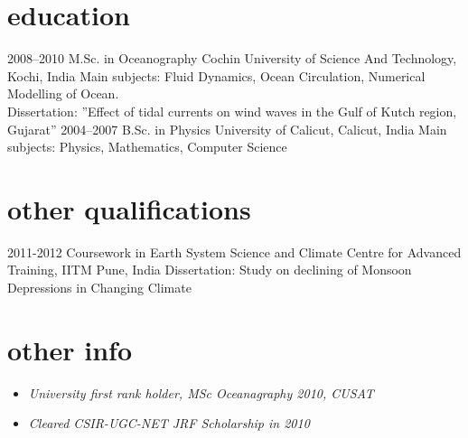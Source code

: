 \documentclass[]{cv-style}          %
\begin{document}
\section{education}
\begin{entrylist}
\entry
{2008--2010}
{M.Sc. {\normalfont in Oceanography}}
{Cochin University of Science And Technology, Kochi, India}
{Main subjects: Fluid Dynamics, Ocean Circulation, Numerical Modelling of Ocean. \\
Dissertation: ”Effect of tidal currents on wind waves in the Gulf of Kutch region, Gujarat”}
\entry
{2004--2007}
{B.Sc. {\normalfont in Physics}}
{University of Calicut, Calicut, India}
{Main subjects: Physics, Mathematics, Computer Science}
\end{entrylist}


\section{other qualifications}

\begin{entrylist}
\entry
{2011-2012}
{Coursework in Earth System Science and Climate}
{Centre for Advanced Training, IITM Pune, India}
{Dissertation: Study on declining of Monsoon Depressions in Changing Climate}
\end{entrylist}


\section{other info}
\begin{itemize}
    \item \emph{University first rank holder, MSc Oceanagraphy 2010, CUSAT}
    \item \emph{Cleared CSIR-UGC-NET JRF Scholarship in 2010}
\end{itemize}
\end{document}
